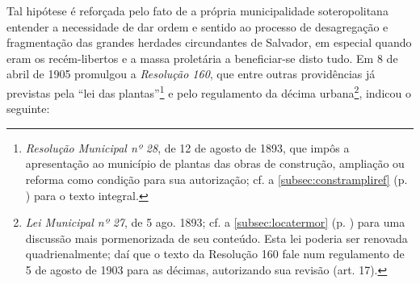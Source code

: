 Tal hipótese é reforçada pelo fato de a própria municipalidade soteropolitana entender a necessidade de dar ordem e sentido ao processo de desagregação e fragmentação das grandes herdades circundantes de Salvador, em especial quando eram os recém-libertos e a massa proletária a beneficiar-se disto tudo. Em 8 de abril de 1905 promulgou a \textit{Resolução 160}, que entre outras providências já previstas pela ``lei das plantas''\footnote{\textit{Resolução Municipal nº 28}, de 12 de agosto de 1893, que impôs a apresentação ao município de plantas das obras de construção, ampliação ou reforma como condição para sua autorização; cf. a \autoref{subsec:constrampliref} (p. \pageref{subsec:constrampliref}) para o texto integral.} e pelo regulamento da décima urbana\footnote{\textit{Lei Municipal nº 27}, de 5 ago. 1893; cf. a \autoref{subsec:locatermor} (p. \pageref{subsec:locatermor}) para uma discussão mais pormenorizada de seu conteúdo. Esta lei poderia ser renovada quadrienalmente; daí que o texto da Resolução 160 fale num regulamento de 5 de agosto de 1903 para as décimas, autorizando sua revisão (art. 17).}, indicou o seguinte:

